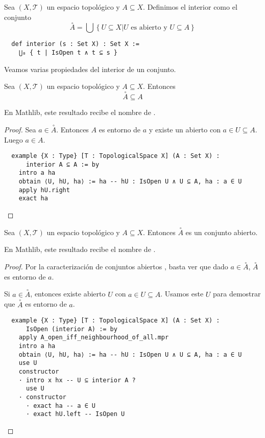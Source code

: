 \begin{definition}
    Sea $(X, \mathcal{T})$ un espacio topológico y $A \subseteq X$. Definimos el \textnormal{interior} como el conjunto
    $$
    \overset{\circ}{A} = \bigcup \left\{ U \subseteq X | U \text{ es abierto y } U \subseteq A \right\}
    $$
\end{definition}

\begin{lstlisting}
  def interior (s : Set X) : Set X :=
    ⋃₀ { t | IsOpen t ∧ t ⊆ s }
\end{lstlisting}

Veamos varias propiedades del interior de un conjunto.

\begin{proposition}
  Sea $(X, \mathcal{T})$ un espacio topológico y $A \subseteq X$. Entonces
  $$
  \overset{\circ}{A} \subseteq A
  $$
\end{proposition}

En Mathlib, este resultado recibe el nombre de .

\begin{proof}
  Sea $a \in \overset{\circ}{A}$. Entonces $A$ es entorno de $a$ y existe un abierto con $a \in U \subseteq A$. Luego $a \in A$.

  \begin{lstlisting}
  example {X : Type} [T : TopologicalSpace X] (A : Set X) :
      interior A ⊆ A := by
    intro a ha
    obtain ⟨U, hU, ha⟩ := ha -- hU : IsOpen U ∧ U ⊆ A, ha : a ∈ U
    apply hU.right
    exact ha \end{lstlisting}
\end{proof}

\begin{proposition}
    Sea $(X, \mathcal{T})$ un espacio topológico y $A \subseteq X$. Entonces $\overset{\circ}{A}$ es un conjunto abierto.
\end{proposition}

En Mathlib, este resultado recibe el nombre de .

\begin{proof}
  Por la caracterización de conjuntos abiertos , basta ver que dado $a \in \overset{\circ}{A}$, $\overset{\circ}{A}$ es entorno de $a$.
  
  Si $a \in \overset{\circ}{A}$, entonces existe abierto $U$ con $a \in U \subseteq A$. Usamos este $U$ para demostrar que $\overset{\circ}{A}$ es entorno de $a$.

  \begin{lstlisting}
  example {X : Type} [T : TopologicalSpace X] (A : Set X) :
      IsOpen (interior A) := by
    apply A_open_iff_neighbourhood_of_all.mpr
    intro a ha
    obtain ⟨U, hU, ha⟩ := ha -- hU : IsOpen U ∧ U ⊆ A, ha : a ∈ U
    use U
    constructor
    · intro x hx -- U ⊆ interior A ?
      use U
    · constructor
      · exact ha -- a ∈ U
      · exact hU.left -- IsOpen U \end{lstlisting}
\end{proof}



